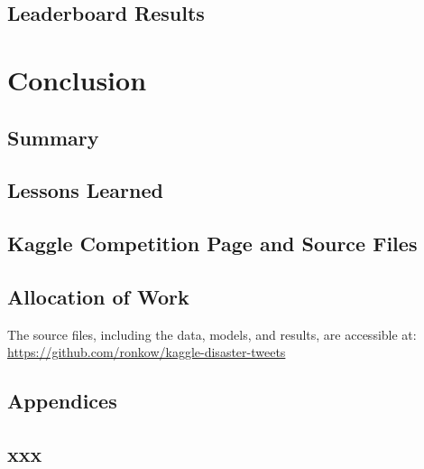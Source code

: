 \documentclass[11pt]{report}
\begin{document}
\section{Leaderboard Results}


\chapter{Conclusion}


\section{Summary}



\section{Lessons Learned}



\section{Kaggle Competition Page and Source Files}

\section{Allocation of Work}

The source files, including the data, models, and results, are accessible at:\\ 
\indent \url{https://github.com/ronkow/kaggle-disaster-tweets}








\pagebreak
{}
{}
\section*{\Huge{Appendices}}

\renewcommand{\thesection}{\Alph{section}}
\appendix

\section{xxx}\label{appendix:schema}
\end{document}

